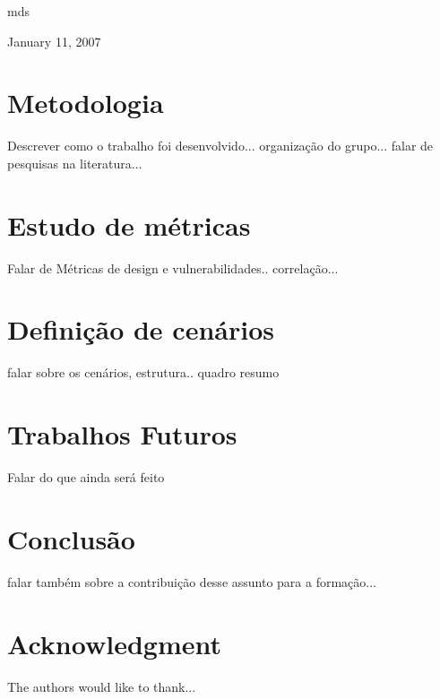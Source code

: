 \documentclass[conference]{IEEEtran}
\begin{document}
\hfill mds
 
\hfill January 11, 2007

\section{Metodologia}
Descrever como o trabalho foi desenvolvido... organização do grupo... falar de pesquisas na literatura...

\section{Estudo de métricas}
Falar de Métricas de design e vulnerabilidades.. correlação...

\section{Definição de cenários}
falar sobre os cenários, estrutura.. quadro resumo

\section{Trabalhos Futuros}
Falar do que ainda será feito

\section{Conclusão}
falar também sobre a contribuição desse assunto para a formação...




\section*{Acknowledgment}


The authors would like to thank...




%
%
%




\end{document}
